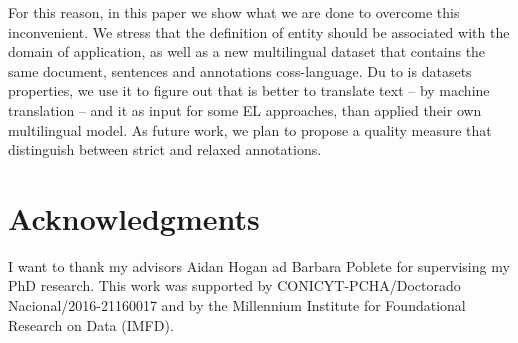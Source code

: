 \documentclass[sigconf]{acmart}
\begin{document}
For this reason, in this paper we show what we are done to overcome this inconvenient. We stress that the definition of entity should be associated with the domain of application, as well as a new multilingual dataset that contains the same document, sentences and annotations coss-language. Du to is datasets properties, we use it to figure out that is better to translate text -- by machine translation -- and it as input for some EL approaches, than applied their own multilingual model. As future work, we plan to propose a quality measure that distinguish between strict and relaxed annotations. 

\section{Acknowledgments}
I want to thank my advisors Aidan Hogan ad Barbara Poblete for supervising my PhD research. This work was supported by CONICYT-PCHA/Doctorado Nacional/2016-21160017 and by the Millennium Institute for Foundational Research on Data (IMFD).

%


\end{document}
